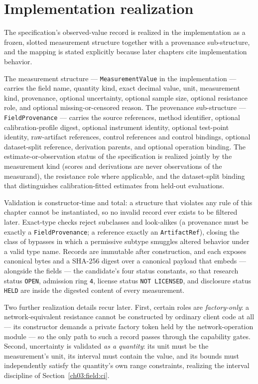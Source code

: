 \section{Implementation realization}\label{ch03:realization}

The specification's observed-value record is realized in the implementation as a frozen, slotted measurement structure together with a provenance sub-structure, and the mapping is stated explicitly because later chapters cite implementation behavior.

The measurement structure --- \texttt{MeasurementValue} in the implementation --- carries the field name, quantity kind, exact decimal value, unit, measurement kind, provenance, optional uncertainty, optional sample size, optional resistance role, and optional missing-or-censored reason. The provenance sub-structure --- \texttt{FieldProvenance} --- carries the source references, method identifier, optional calibration-profile digest, optional instrument identity, optional test-point identity, raw-artifact references, control references and control bindings, optional dataset-split reference, derivation parents, and optional operation binding. The estimate-or-observation status of the specification is realized jointly by the measurement kind (scores and derivations are never observations of the measurand), the resistance role where applicable, and the dataset-split binding that distinguishes calibration-fitted estimates from held-out evaluations.

Validation is constructor-time and total: a structure that violates any rule of this chapter cannot be instantiated, so no invalid record ever exists to be filtered later. Exact-type checks reject subclasses and look-alikes (a provenance must be exactly a \texttt{FieldProvenance}; a reference exactly an \texttt{ArtifactRef}), closing the class of bypasses in which a permissive subtype smuggles altered behavior under a valid type name. Records are immutable after construction, and each exposes canonical bytes and a SHA-256 digest over a canonical payload that embeds --- alongside the fields --- the candidate's four status constants, so that research status \texttt{OPEN}, admission ring \texttt{4}, license status \texttt{NOT LICENSED}, and disclosure status \texttt{HELD} are inside the digested content of every measurement.

Two further realization details recur later. First, certain roles are \emph{factory-only}: a network-equivalent resistance cannot be constructed by ordinary client code at all --- its constructor demands a private factory token held by the network-operation module --- so the only path to such a record passes through the capability gates. Second, uncertainty is validated \emph{as a quantity}: its unit must be the measurement's unit, its interval must contain the value, and its bounds must independently satisfy the quantity's own range constraints, realizing the interval discipline of Section~\ref{ch03:field:ci}.

